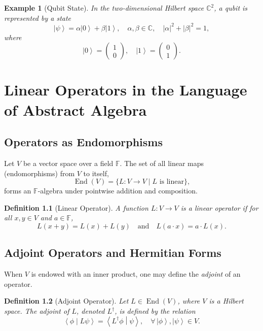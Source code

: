\documentclass[11pt,oneside]{book}
\newtheorem{definition}{Definition}[chapter]
\newtheorem{example}{Example}[chapter]
\theoremstyle{remark}
\renewcommand{\ket}[1]{\left| #1 \right\rangle}
\renewcommand{\braket}[2]{\left\langle #1 \middle| #2 \right\rangle}
\begin{document}
	\begin{example}[Qubit State]
		In the two-dimensional Hilbert space $\mathbb{C}^2$, a \emph{qubit} is represented by a state
		\[
		\ket{\psi} = \alpha\ket{0} + \beta\ket{1}, \quad \alpha,\beta\in\mathbb{C}, \quad |\alpha|^2+|\beta|^2=1,
		\]
		where
		\[
		\ket{0} = \begin{pmatrix} 1 \\ 0 \end{pmatrix}, \quad \ket{1} = \begin{pmatrix} 0 \\ 1 \end{pmatrix}.
		\]
	\end{example}
	
	\chapter{Linear Operators in the Language of Abstract Algebra}
	\section{Operators as Endomorphisms}
	Let $V$ be a vector space over a field $\mathbb{F}$. The set of all linear maps (endomorphisms) from $V$ to itself,
	\[
	\operatorname{End}(V) = \{ L: V \to V \mid L \text{ is linear} \},
	\]
	forms an $\mathbb{F}$-algebra under pointwise addition and composition.
	
	\begin{definition}[Linear Operator]
		A function $L: V \to V$ is a \emph{linear operator} if for all $x,y\in V$ and $a\in\mathbb{F}$,
		\[
		L(x+y) = L(x) + L(y) \quad \text{and} \quad L(a \cdot x) = a \cdot L(x).
		\]
	\end{definition}
	
	\section{Adjoint Operators and Hermitian Forms}
	When $V$ is endowed with an inner product, one may define the \emph{adjoint} of an operator.
	
	\begin{definition}[Adjoint Operator]
		Let $L\in \operatorname{End}(V)$, where $V$ is a Hilbert space. The \emph{adjoint} of $L$, denoted $L^\dagger$, is defined by the relation
		\[
		\braket{\phi}{L\psi} = \braket{L^\dagger \phi}{\psi}, \quad \forall\, \ket{\phi},\ket{\psi}\in V.
		\]
	\end{definition}
	
\end{document}
